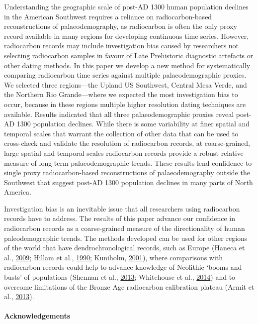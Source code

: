 \documentclass[
]{article}
\begin{document}
Understanding the geographic scale of post-AD 1300 human population declines in the American Southwest requires a reliance on radiocarbon-based reconstructions of palaeodemography, as radiocarbon is often the only proxy record available in many regions for developing continuous time series. However, radiocarbon records may include investigation bias caused by researchers not selecting radiocarbon samples in favour of Late Prehistoric diagnostic artefacts or other dating methods. In this paper we develop a new method for systematically comparing radiocarbon time series against multiple palaeodemographic proxies. We selected three regions---the Upland US Southwest, Central Mesa Verde, and the Northern Rio Grande---where we expected the most investigation bias to occur, because in these regions multiple higher resolution dating techniques are available. Results indicated that all three palaeodemographic proxies reveal post-AD 1300 population declines. While there is some variability at finer spatial and temporal scales that warrant the collection of other data that can be used to cross-check and validate the resolution of radiocarbon records, at coarse-grained, large spatial and temporal scales radiocarbon records provide a robust relative measure of long-term palaeodemographic trends. These results lend confidence to single proxy radiocarbon-based reconstructions of palaeodemography outside the Southwest that suggest post-AD 1300 population declines in many parts of North America.

Investigation bias is an inevitable issue that all researchers using radiocarbon records have to address. The results of this paper advance our confidence in radiocarbon records as a coarse-grained measure of the directionality of human paleodemographic trends. The methods developed can be used for other regions of the world that have dendrochronological records, such as Europe (Haneca et al., \protect\hyperlink{ref-Haneca2009}{2009}; Hillam et al., \protect\hyperlink{ref-Hillam1990}{1990}; Kuniholm, \protect\hyperlink{ref-Kuniholm2001}{2001}), where comparisons with radiocarbon records could help to advance knowledge of Neolithic `booms and busts' of populations (Shennan et al., \protect\hyperlink{ref-Shennan2013}{2013}; Whitehouse et al., \protect\hyperlink{ref-Whitehouse2014}{2014}) and to overcome limitations of the Bronze Age radiocarbon calibration plateau (Armit et al., \protect\hyperlink{ref-Armit2013}{2013}).

\hypertarget{acknowledgements}{%
\paragraph*{Acknowledgements}\label{acknowledgements}}
\end{document}
